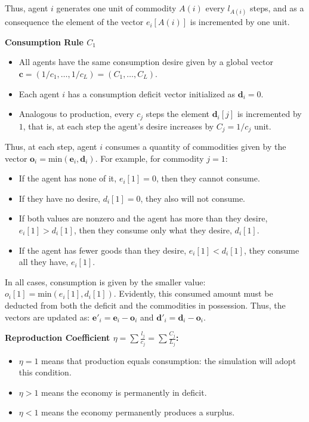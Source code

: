 Thus, agent $i$ generates one unit of commodity $A(i)$ every $l_{A(i)}$ steps, and as a consequence the element of the vector $e_{i}[A(i)]$ is incremented by one unit.


\textbf{Consumption Rule $C_{1}$}

\begin{itemize}
    \item  All agents have the same consumption desire given by a global vector  
  $\boldsymbol{c}=\left(1/c_{1},\dots,1/c_{L}\right)=\left(C_{1},\dots,C_{L}\right)$.  
\item Each agent $i$ has a consumption deficit vector initialized as $\boldsymbol{d}_{i}=0$.  
\item Analogous to production, every $c_{j}$ steps the element $\boldsymbol{d}_{i}[j]$ is incremented by $1$,    that is, at each step the agent’s desire increases by $C_{j}=1/c_{j}$ unit.  
\end{itemize}

Thus, at each step, agent $i$ consumes a quantity of commodities given by the vector  $\boldsymbol{o}_{i}=\text{min}\left(\boldsymbol{e}_{i},\boldsymbol{d}_{i}\right)$.  For example, for commodity $j=1$:  
\begin{itemize}
    \item  If the agent has none of it, $e_{i}[1]=0$, then they cannot consume.  
\item If they have no desire, $d_{i}[1]=0$, they also will not consume.  
\item If both values are nonzero and the agent has more than they desire, $e_{i}[1]>d_{i}[1]$,    then they consume only what they desire, $d_{i}[1]$.  
\item If the agent has fewer goods than they desire, $e_{i}[1]<d_{i}[1]$,    they consume all they have, $e_{i}[1]$.  
\end{itemize}

In all cases, consumption is given by the smaller value:  
$o_{i}[1]=\text{min}\left(e_{i}[1],d_{i}[1]\right)$.  Evidently, this consumed amount must be deducted from both the deficit and the commodities in possession.  Thus, the vectors are updated as:  $\boldsymbol{e}'_{i}=\boldsymbol{e}_{i}-\boldsymbol{o}_{i}$ and $\boldsymbol{d}'_{i}=\boldsymbol{d}_{i}-\boldsymbol{o}_{i}$.


\textbf{Reproduction Coefficient $\eta=\sum\frac{l_{j}}{c_{j}}=\sum\frac{C_{j}}{L_{j}}$:  }
\begin{itemize}
    \item  $\eta=1$ means that production equals consumption: the simulation will adopt this condition.  
\item $\eta>1$ means the economy is permanently in deficit.  
\item $\eta<1$ means the economy permanently produces a surplus.  

\end{itemize}

